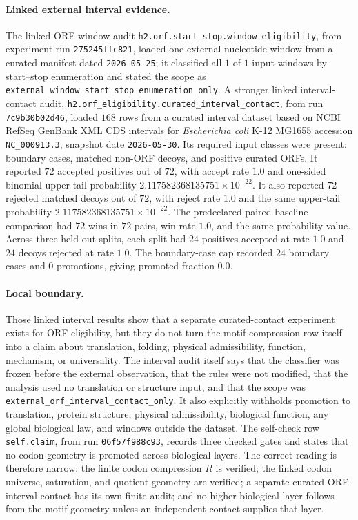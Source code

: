 \paragraph{Linked external interval evidence.}
The linked ORF-window audit \texttt{h2.orf.start\_stop.window\_eligibility}, from experiment run \texttt{275245ffc821}, loaded one external nucleotide window from a curated manifest dated \texttt{2026-05-25}; it classified all $1$ of $1$ input windows by start--stop enumeration and stated the scope as \texttt{external\_window\_start\_stop\_enumeration\_only}.  A stronger linked interval-contact audit, \texttt{h2.orf\_eligibility.curated\_interval\_contact}, from run \texttt{7c9b30b02d46}, loaded $168$ rows from a curated interval dataset based on NCBI RefSeq GenBank XML CDS intervals for \textit{Escherichia coli} K-12 MG1655 accession \texttt{NC\_000913.3}, snapshot date \texttt{2026-05-30}.  Its required input classes were present: boundary cases, matched non-ORF decoys, and positive curated ORFs.  It reported $72$ accepted positives out of $72$, with accept rate $1.0$ and one-sided binomial upper-tail probability $2.117582368135751\times 10^{-22}$.  It also reported $72$ rejected matched decoys out of $72$, with reject rate $1.0$ and the same upper-tail probability $2.117582368135751\times 10^{-22}$.  The predeclared paired baseline comparison had $72$ wins in $72$ pairs, win rate $1.0$, and the same probability value.  Across three held-out splits, each split had $24$ positives accepted at rate $1.0$ and $24$ decoys rejected at rate $1.0$.  The boundary-case cap recorded $24$ boundary cases and $0$ promotions, giving promoted fraction $0.0$.

\paragraph{Local boundary.}
Those linked interval results show that a separate curated-contact experiment exists for ORF eligibility, but they do not turn the motif compression row itself into a claim about translation, folding, physical admissibility, function, mechanism, or universality.  The interval audit itself says that the classifier was frozen before the external observation, that the rules were not modified, that the analysis used no translation or structure input, and that the scope was \texttt{external\_orf\_interval\_contact\_only}.  It also explicitly withholds promotion to translation, protein structure, physical admissibility, biological function, any global biological law, and windows outside the dataset.  The self-check row \texttt{self.claim}, from run \texttt{06f57f988c93}, records three checked gates and states that no codon geometry is promoted across biological layers.  The correct reading is therefore narrow: the finite codon compression $R$ is verified; the linked codon universe, saturation, and quotient geometry are verified; a separate curated ORF-interval contact has its own finite audit; and no higher biological layer follows from the motif geometry unless an independent contact supplies that layer.